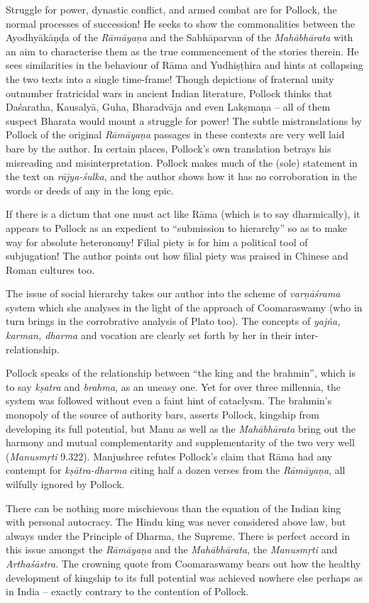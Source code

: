 Struggle for power, dynastic conflict, and armed combat are for Pollock, the normal processes of succession! He seeks to show the commonalities between the Ayodhyākāṇḍa of the {\sl Rāmāyaṇa} and the Sabhāparvan of the {\sl Mahābhārata} with an aim to characterise them as the true commencement of the stories therein. He sees similarities in the behaviour of Rāma and Yudhiṣṭhira and hints at collapsing the two texts into a single time-frame! Though depictions of fraternal unity outnumber fratricidal wars in ancient Indian literature, Pollock thinks that Daśaratha, Kausalyā, Guha, Bharadvāja and even Lakṣmaṇa -- all of them suspect Bharata would mount a struggle for power! The subtle mistranslations by Pollock of the original {\sl Rāmāyaṇa} passages in these contexts are very well laid bare by the author. In certain places, Pollock's own translation betrays his misreading and misinterpretation. Pollock makes much of the (sole) statement in the text on {\sl rājya-śulka}, and the author shows how it has no corroboration in the words or deeds of any in the long epic. 

If there is a dictum that one must act like Rāma (which is to say dharmically), it appears to Pollock as an expedient to “submission to hierarchy” so as to make way for absolute heteronomy! Filial piety is for him a political tool of subjugation! The author points out how filial piety was praised in Chinese and Roman cultures too. 

The issue of social hierarchy takes our author into the scheme of {\sl varṇāśrama} system which she analyses in the light of the approach of Coomaraswamy (who in turn brings in the corrobrative analysis of Plato too). The concepts of {\sl yajña, karman, dharma} and vocation are clearly set forth by her in their inter-relationship.

Pollock speaks of the relationship between “the king and the brahmin”, which is to say {\sl kṣatra} and {\sl brahma}, as an uneasy one. Yet for over three millennia, the system was followed without even a faint hint of cataclysm. The brahmin's monopoly of the source of authority bars, asserts Pollock, kingship from developing its full potential, but Manu as well as the {\sl Mahābhārata} bring out the harmony and mutual complementarity and supplementarity of the two very well ({\sl Manusmṛti} 9.322). Manjushree refutes Pollock's claim that Rāma had any contempt for {\sl kṣātra-dharma} citing half a dozen verses from the {\sl Rāmāyaṇa}, all wilfully ignored by Pollock.

There can be nothing more mischievous than the equation of the Indian king with personal autocracy. The Hindu king was never considered above law, but always under the Principle of Dharma, the Supreme. There is perfect accord in this issue amongst the {\sl Rāmāyaṇa} and the {\sl Mahābhārata}, the {\sl Manusmṛti} and {\sl Arthaśāstra}. The crowning quote from Coomaraswamy bears out how the healthy development of kingship to its full potential was achieved nowhere else perhaps as in India -- exactly contrary to the contention of Pollock.


